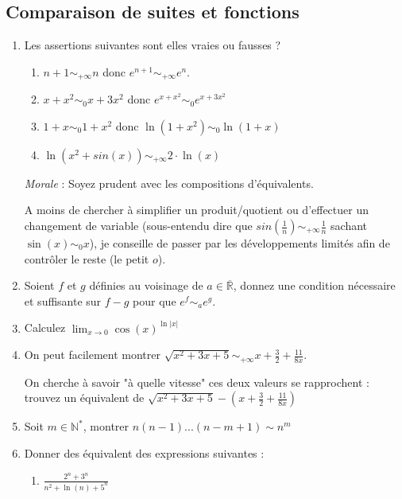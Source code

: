 \documentclass[]{article}
\begin{document}
\subsection{Comparaison de suites et fonctions}

\begin{enumerate}
\item Les assertions suivantes sont elles vraies ou fausses ?
\begin{enumerate}
	\item $n + 1 \sim_{+\infty} n$ donc $e^{n+1} \sim_{+\infty} e^n$.
	
	\item $x + x^2 \sim_0 x+3x^2$ donc $e^{x + x^2} \sim_0 e^{x + 3x^2}$
	
	\item $1+x \sim_0 1+x^2$ donc $\ln(1+x^2) \sim_{0} \ln(1+x)$
	
	\item $\ln(x^2+sin (x)) \sim_{+\infty} 2\cdot \ln(x)$
	
\end{enumerate}

\textit{Morale} : Soyez prudent avec les compositions d'équivalents.

A moins de chercher à simplifier un produit/quotient ou d'effectuer un changement de variable (sous-entendu dire que $sin\left(\frac{1}{n}\right) \sim_{+\infty} \frac{1}{n}$ sachant $\sin(x) \sim_0 x$), je conseille de passer par les développements limités afin de contrôler le reste (le petit $o$).

\item Soient $f$ et $g$ définies au voisinage de $a \in \overline{\mathbb{R}}$, donnez une condition nécessaire et suffisante sur $f-g$ pour que $e^f \sim_a e^g$.

\item
Calculez $\displaystyle \lim_{x \to 0}\cos(x)^{\ln|x|}$

\item On peut facilement montrer $\sqrt{x^2+3x+5}\sim_{+\infty}x+\frac{3}{2}+\frac{11}{8x}$.

On cherche à savoir "à quelle vitesse" ces deux valeurs se rapprochent : trouvez un équivalent de $\sqrt{x^2+3x+5}-(x+\frac{3}{2}+\frac{11}{8x})$

\item Soit $m \in \mathbb{N}^*$, montrer $n(n-1)...(n-m+1) \sim n^m$

\item Donner des équivalent des expressions suivantes : 
\begin{enumerate}
	\item $\frac{2^n + 3^n}{n^2+\ln(n)+5^n}$


\end{enumerate}
\end{enumerate}
\end{document}
